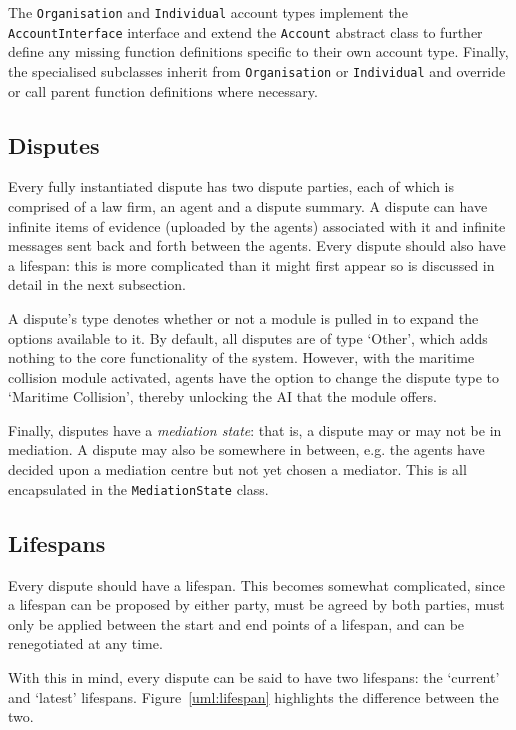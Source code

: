 The \lstinline{Organisation} and \lstinline{Individual} account types implement the \lstinline{AccountInterface} interface and extend the \lstinline{Account} abstract class to further define any missing function definitions specific to their own account type. Finally, the specialised subclasses inherit from \lstinline{Organisation} or \lstinline{Individual} and override or call parent function definitions where necessary.

\subsection{Disputes}

Every fully instantiated dispute has two dispute parties, each of which is comprised of a law firm, an agent and a dispute summary. A dispute can have infinite items of evidence (uploaded by the agents) associated with it and infinite messages sent back and forth between the agents. Every dispute should also have a lifespan: this is more complicated than it might first appear so is discussed in detail in the next subsection.

A dispute's type denotes whether or not a module is pulled in to expand the options available to it. By default, all disputes are of type `Other', which adds nothing to the core functionality of the system. However, with the maritime collision module activated, agents have the option to change the dispute type to `Maritime Collision', thereby unlocking the AI that the module offers.

Finally, disputes have a \emph{mediation state}: that is, a dispute may or may not be in mediation. A dispute may also be somewhere in between, e.g. the agents have decided upon a mediation centre but not yet chosen a mediator. This is all encapsulated in the \lstinline{MediationState} class.

\subsection{Lifespans}

Every dispute should have a lifespan. This becomes somewhat complicated, since a lifespan can be proposed by either party, must be agreed by both parties, must only be applied between the start and end points of a lifespan, and can be renegotiated at any time.

With this in mind, every dispute can be said to have two lifespans: the `current' and `latest' lifespans. Figure~\ref{uml:lifespan} highlights the difference between the two. 

